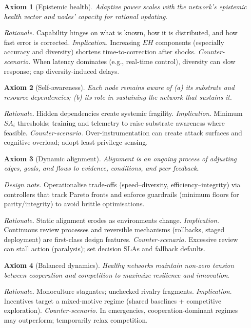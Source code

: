 \documentclass[12pt]{article}
\newtheorem{axiom}{Axiom}
\begin{document}
\begin{axiom}[Epistemic health]
Adaptive power scales with the network's epistemic health vector and nodes' capacity for rational updating.
\end{axiom}
\emph{Rationale.} Capability hinges on what is known, how it is distributed, and how fast error is corrected. 
\emph{Implication.} Increasing $EH$ components (especially accuracy and diversity) shortens time-to-correction after shocks.
\emph{Counter-scenario.} When latency dominates (e.g., real-time control), diversity can slow response; cap diversity-induced delays.

\begin{axiom}[Self-awareness]
Each node remains aware of (a) its substrate and resource dependencies; (b) its role in sustaining the network that sustains it.
\end{axiom}
\emph{Rationale.} Hidden dependencies create systemic fragility. 
\emph{Implication.} Minimum $SA_i$ thresholds; training and telemetry to raise substrate awareness where feasible.
\emph{Counter-scenario.} Over-instrumentation can create attack surfaces and cognitive overload; adopt least-privilege sensing.

\begin{axiom}[Dynamic alignment]
Alignment is an ongoing process of adjusting edges, goals, and flows to evidence, conditions, and peer feedback.
\end{axiom}
\emph{Design note.} Operationalise trade-offs (speed--diversity, efficiency--integrity) via controllers that track Pareto fronts and enforce guardrails (minimum floors for parity/integrity) to avoid brittle optimisations.

\emph{Rationale.} Static alignment erodes as environments change. 
\emph{Implication.} Continuous review processes and reversible mechanisms (rollbacks, staged deployment) are first-class design features.
\emph{Counter-scenario.} Excessive review can stall action (paralysis); set decision SLAs and fallback defaults.

\begin{axiom}[Balanced dynamics]
Healthy networks maintain non-zero tension between cooperation and competition to maximize resilience and innovation.
\end{axiom}
\emph{Rationale.} Monoculture stagnates; unchecked rivalry fragments. 
\emph{Implication.} Incentives target a mixed-motive regime (shared baselines + competitive exploration).
\emph{Counter-scenario.} In emergencies, cooperation-dominant regimes may outperform; temporarily relax competition.
\end{document}
